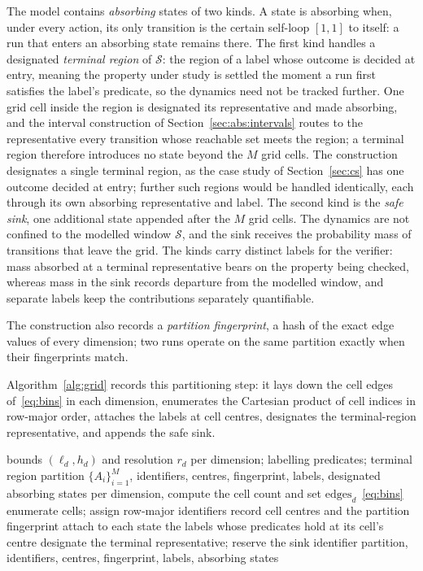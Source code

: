\documentclass[11pt,a4paper]{article}
\theoremstyle{plain}
\theoremstyle{remark}
\begin{document}
	The model contains \emph{absorbing} states of two kinds. A state is
	absorbing when, under every action, its only transition is the
	certain self-loop $[1,1]$ to itself: a run that enters an absorbing
	state remains there. The first kind handles a designated
	\emph{terminal region} of $\mathcal{S}$: the region of a label whose
	outcome is decided at entry, meaning the property under study is
	settled the moment a run first satisfies the label's predicate, so
	the dynamics need not be tracked further. One grid cell inside the
	region is designated its representative and made absorbing, and the
	interval construction of Section~\ref{sec:abs:intervals} routes to
	the representative every transition whose reachable set meets the
	region; a terminal region therefore introduces no state beyond the
	$M$ grid cells. The construction designates a single terminal
	region, as the case study of Section~\ref{sec:cs} has one outcome
	decided at entry; further such regions would be handled identically,
	each through its own absorbing representative and label. The second
	kind is the \emph{safe sink}, one additional state appended after
	the $M$ grid cells. The dynamics are not confined to the modelled
	window $\mathcal{S}$, and the sink receives the probability mass of
	transitions that leave the grid. The kinds carry distinct labels for
	the verifier: mass absorbed at a terminal representative bears on
	the property being checked, whereas mass in the sink records
	departure from the modelled window, and separate labels keep the
	contributions separately quantifiable. \newline
	
	The construction also records a \emph{partition fingerprint}, a hash
	of the exact edge values of every dimension; two runs operate on the
	same partition exactly when their fingerprints match.
	
	Algorithm~\ref{alg:grid} records this partitioning step: it lays down
	the cell edges of~\eqref{eq:bins} in each dimension, enumerates the
	Cartesian product of cell indices in row-major order, attaches the
	labels at cell centres, designates the terminal-region
	representative, and appends the safe sink.
	
	\begin{algorithm}[H]
		\caption{Grid construction.}
		\label{alg:grid}
		\begin{algorithmic}[1]
			\Require bounds $(\ell_d, h_d)$ and resolution $r_d$ per
			dimension; labelling predicates; terminal region
			\Ensure partition $\{A_i\}_{i=1}^M$, identifiers, centres,
			fingerprint, labels, designated absorbing states
			\State per dimension, compute the cell count and set
			$\text{edges}_d$~\eqref{eq:bins}
			\State enumerate cells; assign row-major identifiers
			\State record cell centres and the partition fingerprint
			\State attach to each state the labels whose predicates hold
			at its cell's centre
			\State designate the terminal representative; reserve the sink
			identifier
			\State \Return partition, identifiers, centres, fingerprint,
			labels, absorbing states
		\end{algorithmic}
	\end{algorithm}
	
\end{document}
